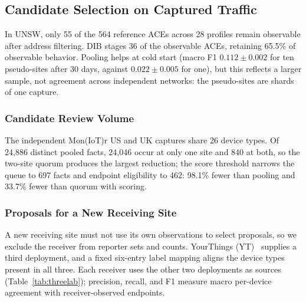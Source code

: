 \documentclass[journal]{IEEEtran}
\theoremstyle{definition}
\begin{document}
\subsection{Candidate Selection on Captured Traffic}
\label{sec:utility-results}
In UNSW, only 55 of the 564 reference ACEs across 28 profiles remain observable after address filtering. DIB stages 36 of the observable ACEs, retaining 65.5\% of observable behavior. Pooling helps at cold start (macro F1 $0.112\pm0.002$ for ten pseudo-sites after 30 days, against $0.022\pm0.005$ for one), but this reflects a larger sample, not agreement across independent networks: the pseudo-sites are shards of one capture.

\subsubsection{Candidate Review Volume}
\label{sec:workload-results}
The independent Mon(IoT)r US and UK captures share 26 device types. Of 24,886 distinct pooled facts, 24,046 occur at only one site and 840 at both, so the two-site quorum produces the largest reduction; the score threshold narrows the queue to 697 facts and endpoint eligibility to 462: 98.1\% fewer than pooling and 33.7\% fewer than quorum with scoring.

\subsubsection{Proposals for a New Receiving Site}
\label{sec:loo-results}
A new receiving site must not use its own observations to select proposals, so we exclude the receiver from reporter sets and counts. YourThings (YT)~\cite{alrawi2019yourthings} supplies a third deployment, and a fixed six-entry label mapping aligns the device types present in all three. Each receiver uses the other two deployments as sources (Table~\ref{tab:threelab}); precision, recall, and F1 measure macro per-device agreement with receiver-observed endpoints.
\end{document}
